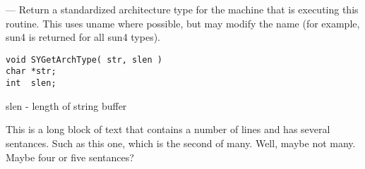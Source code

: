 \startmanpage
{}
--- Return a standardized architecture type for the machine that is executing this routine.  This uses uname where possible, but may modify the name (for example, sun4 is returned for all sun4 types). 
\startvb\begin{verbatim}
void SYGetArchType( str, slen )
char *str;
int  slen;

\end{verbatim}
\endvb

slen - length of string buffer
\par
{}
This is a long block of text that contains a number of lines
and has several sentances.  Such as this one, which is the
second of many.  Well, maybe not many.  Maybe four or
five sentances?
\par
{}
\endmanpage
